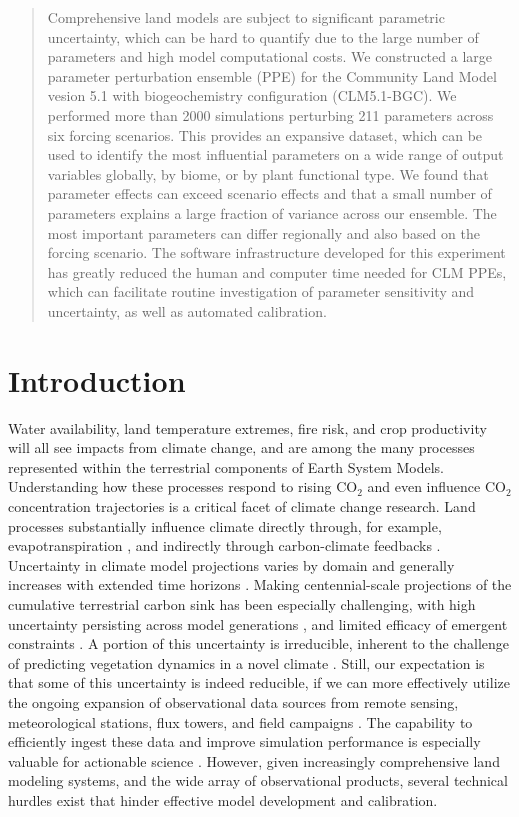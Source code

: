 \documentclass[draft]{agujournal2019}
\begin{document}
\begin{abstract}
Comprehensive land models are subject to significant parametric uncertainty, which can be hard to quantify due to the large number of parameters and high model computational costs. We constructed a large parameter perturbation ensemble (PPE) for the Community Land Model vesion 5.1 with biogeochemistry configuration (CLM5.1-BGC). We performed more than 2000 simulations perturbing 211 parameters across six forcing scenarios. This provides an expansive dataset, which can be used to identify the most influential parameters on a wide range of output variables globally, by biome, or by plant functional type. We found that parameter effects can exceed scenario effects and that a small number of parameters explains a large fraction of variance across our ensemble. The most important parameters can differ regionally and also based on the forcing scenario. The software infrastructure developed for this experiment has greatly reduced the human and computer time needed for CLM PPEs, which can facilitate routine investigation of parameter sensitivity and uncertainty, as well as automated calibration.
\end{abstract}


\section{Introduction}
Water availability, land temperature extremes, fire risk, and crop productivity will all see impacts from climate change, and are among the many processes represented within the terrestrial components of Earth System Models. Understanding how these processes respond to rising CO$_2$ and even influence CO$_2$ concentration trajectories is a critical facet of climate change research. Land processes substantially influence climate directly through, for example, evapotranspiration \cite{zarakas2024}, and indirectly through carbon-climate feedbacks \cite{cox2000}.
Uncertainty in climate model projections varies by domain and generally increases with extended time horizons \cite{koven2022}. 
Making centennial-scale projections of the cumulative terrestrial carbon sink has been especially challenging, with high uncertainty persisting across model generations \cite{friedlingstein2006,friedlingstein2014,arora2020}, and limited efficacy of emergent constraints \cite{liu2024}. A portion of this uncertainty is irreducible, inherent to the challenge of predicting vegetation dynamics in a novel climate \cite{lovenduski2017}. Still, our expectation is that some of this uncertainty is indeed reducible, if we can more effectively utilize the ongoing expansion of observational data sources from remote sensing, meteorological stations, flux towers, and field campaigns \cite{worden2021,baldocchi2024}. The capability to efficiently ingest these data and improve simulation performance is especially valuable for actionable science \cite{cheng2023}. However, given increasingly comprehensive land modeling systems, and the wide array of observational products, several technical hurdles exist that hinder effective model development and calibration.
\end{document}
